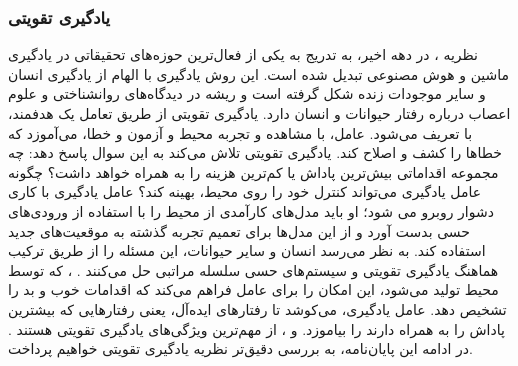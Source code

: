 \subsubsection{یادگیری تقویتی}
نظریه 
\textit{}
،
در دهه اخیر، به تدریج به یکی از فعال‌ترین حوزه‌های تحقیقاتی در یادگیری ماشین و هوش مصنوعی تبدیل شده است. این روش یادگیری با الهام از یادگیری انسان و سایر موجودات زنده شکل گرفته است و ریشه در دیدگاه‌های روانشناختی و علوم اعصاب درباره رفتار حیوانات و انسان دارد.   یادگیری تقویتی از طریق تعامل یک 
\textit{}
هدفمند،
با 
\textit{}
تعریف می‌شود. عامل، با مشاهده و تجربه محیط و آزمون و خطا، می‌‌آموزد که خطاها را کشف و اصلاح کند. یادگیری تقویتی تلاش می‌کند به این سوال پاسخ دهد: چه مجموعه اقداماتی بیش‌ترین پاداش یا کم‌ترین هزینه را به همراه خواهد داشت؟ چگونه عامل یادگیری می‌تواند کنترل خود را روی محیط، بهینه کند؟ عامل یادگیری با کاری دشوار روبرو می شود؛ او باید مدل‌های کارآمدی از محیط را با استفاده از ورودی‌های حسی بدست آورد و از این مدل‌ها برای تعمیم تجربه گذشته به موقعیت‌های جدید استفاده کند. به نظر می‌رسد انسان و سایر حیوانات، این مسئله را از طریق ترکیب هماهنگ یادگیری تقویتی و سیستم‌های حسی سلسله مراتبی حل می‌کنند
\cite{suttonbook}.
 \textit{}،
که توسط محیط تولید می‌شود، این امکان را برای عامل فراهم می‌کند که اقدامات خوب و بد را تشخیص دهد.  عامل یادگیری، می‌کوشد تا رفتارهای ایده‌آل، یعنی رفتارهایی که بیشترین پاداش را به همراه دارند را  بیاموزد.  و ، از مهم‌ترین ویژگی‌های یادگیری تقویتی هستند
\cite{mldef}.
در ادامه این پایان‌نامه، به بررسی دقیق‌تر نظریه یادگیری تقویتی خواهیم پرداخت. 
 
